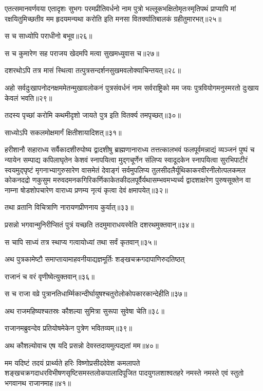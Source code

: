 \begin{flushleft}
एतत्समानवर्णवया एतादृशः सुभगः परमप्रीतिवर्धनो नाम पुत्रो भल्लूकभक्षितोमृतःस्मृतिपथं प्राप्यापि मां रक्षयितुमिच्छतीव मम हृदयमन्यथा करोति इति मनसा वितर्क्यातिबालकं ग्रहीतुमारभत्॥२५॥

स च साध्योपि पराधीनो बभूव॥२६॥

स च कुमारेण सह पराजय खेदमपि मत्वा सुखमध्युवास च॥२७॥

दशरथोऽपि तत्र मासं स्थित्वा तत्पुत्रसन्दर्शनसुखमवलोक्याचिन्तयत्॥२८॥

अहो सर्वदुःखापनोदनक्षममेतन्मुखावलोकनं पुत्रसंवर्धनं नाम सर्वराष्ट्रिको मम जयः पुत्रवियोगमनुस्मरतो दुःखाय केवलं भवति॥२९॥

तदस्य पृच्छां करोमि कथमीदृशो जायते पुत्र इति वितर्क्य तमपृच्छत्॥३०॥

साध्योऽपि सकलमोक्षमार्गं क्षितीशायादिशत्॥३१॥

हरीशानौ सहाराध्य सर्वैकादशीरुपोष्य द्वादशीषु ब्राह्मणानाराध्य तत्तत्कालभवं फलपूर्वमन्नाद्यं व्यञ्जनं पुष्पं च न्यायेन सम्पाद्य कपिलाघृतेन केशवं स्नापयित्वा मुद्गचूर्णेन संलिप्य स्वादूदकेन स्नापयित्वा सुरभिपाटीरं स्वयमुद्घृष्टं मृगनाभ्यागुरुसारेण वासमेतं देवाङ्गं सर्वमुपलिप्य तुलसीदलैर्यूथिकाकरवीरनीलोत्पलकमल कोकनदद्रो णकुसुम मरुवदमनकगिरिकर्णिकाकेतकीदलपूर्वैर्यथासम्भवमभ्यर्च्य द्वादशाक्षरेण पुरुषसूक्तेन वा नाम्ना षोडशोपचारेण वाराध्य प्रणम्य नृत्यं कृत्वा देवं क्षमापयेत्॥३२॥

तथा व्रतानि विचित्राणि नारायणप्रीणनाय कुर्यात्॥३३॥

प्रसन्नो भगवान्मुनिरीप्सितं पुत्रं यच्छति तदमुमाराधयस्वेति दशरथमुक्तवान्॥३४॥

स चापि साध्यं तत्र स्थाप्य गत्वायोध्यां तथा सर्वं कृतवान्॥३५॥

अथ पुत्रकामेष्टौ समाप्तायामाहवनीयाद्यज्ञमूर्तिः शङ्खचक्रगदापाणिरुदतिष्ठत्

राजानं च वरं वृणीष्वेत्युक्तवान्॥३६॥

स च राजा वव्रे पुत्रानतिधार्म्मिकान्दीर्घायुषश्चतुरोलोकोपकारकान्देहीति॥३७॥

अथ राजमहिष्यश्चतस्रः कौशल्या सुमित्रा सुरूपा सुवेषा चेति॥३८॥

राजानमब्रुवन्देव प्रतियोषमेकेन पुत्रेण भवितव्यम्॥३९॥

अथ कौशल्योवाच एष यदि प्रसन्नो देवस्तदायमुत्पद्यतां मम॥४०॥


मम यदिष्टं तदयं प्रार्थ्यते हरिः विष्णोप्रसीददेवेश कमलापते शङ्खचक्रगदाधरविभीषणसृष्टिसमस्तलोकपालादिपूजित पादयुगलशाश्वतहरे नमस्ते नमस्ते एवं स्तुतो भगवानथ राजानमाह॥४१॥



\end{flushleft}
